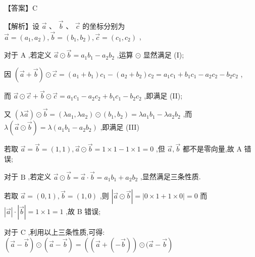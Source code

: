 \documentclass[10pt]{article}
\begin{document}
【答案】C

【解析】设 \(\overrightarrow{a}\text{ 、 }\overrightarrow{b}\text{ 、 }\overrightarrow{c}\) 的坐标分别为 \(\overrightarrow{a} = \left( {{a}_{1},{a}_{2}}\right) ,\overrightarrow{b} = \left( {{b}_{1},{b}_{2}}\right) ,\overrightarrow{c} = \left( {{c}_{1},{c}_{2}}\right)\) ,

对于 \(\mathrm{A}\) ,若定义 \(\overrightarrow{a} \odot  \overrightarrow{b} = {a}_{1}{b}_{1} - {a}_{2}{b}_{2}\) ,运算 \(\odot\) 显然满足 (I);

因 \(\left( {\overrightarrow{a} + \overrightarrow{b}}\right)  \odot  \overrightarrow{c} = \left( {{a}_{1} + {b}_{1}}\right) {c}_{1} - \left( {{a}_{2} + {b}_{2}}\right) {c}_{2} = {a}_{1}{c}_{1} + {b}_{1}{c}_{1} - {a}_{2}{c}_{2} - {b}_{2}{c}_{2}\) ,

而 \(\overrightarrow{a} \odot  \overrightarrow{c} + \overrightarrow{b} \odot  \overrightarrow{c} = {a}_{1}{c}_{1} - {a}_{2}{c}_{2} + {b}_{1}{c}_{1} - {b}_{2}{c}_{2}\) ,即满足 (II);

又 \(\left( {\lambda \overrightarrow{a}}\right)  \odot  \overrightarrow{b} = \left( {\lambda {a}_{1},\lambda {a}_{2}}\right)  \odot  \left( {{b}_{1},{b}_{2}}\right)  = \lambda {a}_{1}{b}_{1} - \lambda {a}_{2}{b}_{2}\) ,而 \(\lambda \left( {\overrightarrow{a} \odot  \overrightarrow{b}}\right)  = \lambda \left( {{a}_{1}{b}_{1} - {a}_{2}{b}_{2}}\right)\) ,即满足 (III)

若取 \(\overrightarrow{a} = \overrightarrow{b} = \left( {1,1}\right) ,\overrightarrow{a} \odot  \overrightarrow{b} = 1 \times  1 - 1 \times  1 = 0\) ,但 \(\overrightarrow{a},\overrightarrow{b}\) 都不是零向量,故 \(\mathrm{A}\) 错误;

对于 \(\mathrm{B}\) ,若定义 \(\overrightarrow{a} \odot  \overrightarrow{b} = \overrightarrow{a} \cdot  \overrightarrow{b} = {a}_{1}{b}_{1} + {a}_{2}{b}_{2}\) ,显然满足三条性质.

若取 \(\overrightarrow{a} = \left( {0,1}\right) ,\overrightarrow{b} = \left( {1,0}\right)\) ,则 \(\left| {\overrightarrow{a} \odot  \overrightarrow{b}}\right|  = \left| {0 \times  1 + 1 \times  0}\right|  = 0\) 而 \(\left| \overrightarrow{a}\right|  \cdot  \left| \overrightarrow{b}\right|  = 1 \times  1 = 1\) ,故 B 错误;

对于 \(\mathrm{C}\) ,利用以上三条性质,可得: \(\left( {\overrightarrow{a} - \overrightarrow{b}}\right)  \odot  \left( {\overrightarrow{a} - \overrightarrow{b}}\right)  = \left( {\left( {\overrightarrow{a} + \left( {-\overrightarrow{b}}\right) }\right)  \odot  (\overrightarrow{a} - \overrightarrow{b}}\right)\)
\end{document}
